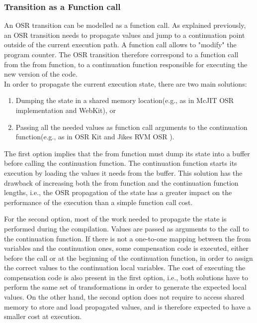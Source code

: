 \subsubsection{Transition as a Function call}
An OSR transition can be modelled as a function call.
As explained previously, an OSR transition needs to propagate values and jump to a continuation point outside of the current execution path.
A function call allows to "modify" the program counter.
The OSR transition therefore correspond to a function call from the from function, to a continuation function responsible for executing the new version of the code.\\

In order to propagate the current execution state, there are two main solutions: 
\begin{enumerate}
    \item Dumping the state in a shared memory location(e.g., as in McJIT OSR implementation\cite{lameed2013modular} and WebKit\cite{WebKitURL}), or
    \item Passing all the needed values as function call arguments to the continuation function(e.g., as in OSR Kit\cite{OSRKit} and Jikes RVM OSR \cite{fink2003design}).
\end{enumerate}

The first option implies that the from function must dump its state into a buffer before calling the continuation function.
The continuation function starts its execution by loading the values it needs from the buffer.
This solution has the drawback of increasing both the from function and the continuation function lengths, i.e., the OSR propagation of the state has a greater impact on the performance of the execution than a simple function call cost.\\


For the second option, most of the work needed to propagate the state is performed during the compilation.
Values are passed as arguments to the call to the continuation function.
If there is not a one-to-one mapping between the from variables and the continuation ones, some compensation code is executed, either before the call or at the beginning of the continuation function, in order to assign the correct values to the continuation local variables.
The cost of executing the compensation code is also present in the first option, i.e., both solutions have to perform the same set of transformations in order to generate the expected local values.
On the other hand, the second option does not require to access shared memory to store and load propagated values, and is therefore expected to have a smaller cost at execution.\\

